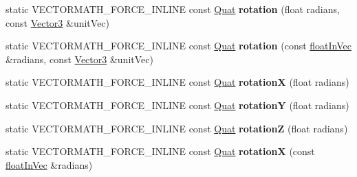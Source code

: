 \begin{DoxyCompactItemize}
\mbox{\label{classVectormath_1_1Aos_1_1Quat_abf5142c735bddf65c1b73e3d425dd7bc}} 
static V\+E\+C\+T\+O\+R\+M\+A\+T\+H\+\_\+\+F\+O\+R\+C\+E\+\_\+\+I\+N\+L\+I\+NE const \hyperlink{classVectormath_1_1Aos_1_1Quat}{Quat} {\bfseries rotation} (float radians, const \hyperlink{classVectormath_1_1Aos_1_1Vector3}{Vector3} \&unit\+Vec)
\item 
\mbox{\label{classVectormath_1_1Aos_1_1Quat_a83eb4f0fe22fbd7a3ec691189974dfce}} 
static V\+E\+C\+T\+O\+R\+M\+A\+T\+H\+\_\+\+F\+O\+R\+C\+E\+\_\+\+I\+N\+L\+I\+NE const \hyperlink{classVectormath_1_1Aos_1_1Quat}{Quat} {\bfseries rotation} (const \hyperlink{classVectormath_1_1floatInVec}{float\+In\+Vec} \&radians, const \hyperlink{classVectormath_1_1Aos_1_1Vector3}{Vector3} \&unit\+Vec)
\item 
\mbox{\label{classVectormath_1_1Aos_1_1Quat_adb1cf746cbe7fa5cf69664b436be84c2}} 
static V\+E\+C\+T\+O\+R\+M\+A\+T\+H\+\_\+\+F\+O\+R\+C\+E\+\_\+\+I\+N\+L\+I\+NE const \hyperlink{classVectormath_1_1Aos_1_1Quat}{Quat} {\bfseries rotationX} (float radians)
\item 
\mbox{\label{classVectormath_1_1Aos_1_1Quat_ab0b7ce8590c59acd31ed131321d08704}} 
static V\+E\+C\+T\+O\+R\+M\+A\+T\+H\+\_\+\+F\+O\+R\+C\+E\+\_\+\+I\+N\+L\+I\+NE const \hyperlink{classVectormath_1_1Aos_1_1Quat}{Quat} {\bfseries rotationY} (float radians)
\item 
\mbox{\label{classVectormath_1_1Aos_1_1Quat_ac8eb2952c4d6297593c617cfd1edf16d}} 
static V\+E\+C\+T\+O\+R\+M\+A\+T\+H\+\_\+\+F\+O\+R\+C\+E\+\_\+\+I\+N\+L\+I\+NE const \hyperlink{classVectormath_1_1Aos_1_1Quat}{Quat} {\bfseries rotationZ} (float radians)
\item 
\mbox{\label{classVectormath_1_1Aos_1_1Quat_a4b7eb17a62487bdda816a311e76d5112}} 
static V\+E\+C\+T\+O\+R\+M\+A\+T\+H\+\_\+\+F\+O\+R\+C\+E\+\_\+\+I\+N\+L\+I\+NE const \hyperlink{classVectormath_1_1Aos_1_1Quat}{Quat} {\bfseries rotationX} (const \hyperlink{classVectormath_1_1floatInVec}{float\+In\+Vec} \&radians)
\item 
\mbox{\label{classVectormath_1_1Aos_1_1Quat_a3e9474f58a664ed3cdc3b21008d7343d}} 

\end{DoxyCompactItemize}
